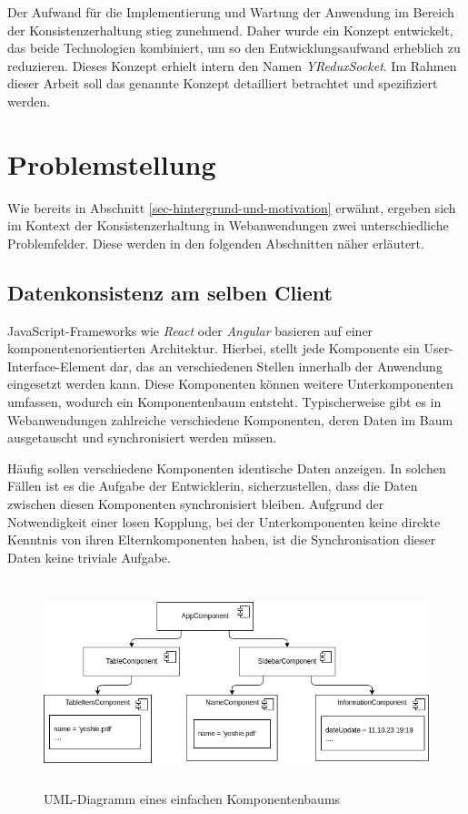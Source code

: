 \documentclass[12pt]{book}          %
\begin{document}
Der Aufwand für die Implementierung und Wartung der Anwendung im Bereich der Konsistenzerhaltung stieg zunehmend. Daher wurde ein Konzept entwickelt, das beide Technologien kombiniert, um so den Entwicklungsaufwand erheblich zu reduzieren. Dieses Konzept erhielt intern den Namen \textit{YReduxSocket}. Im Rahmen dieser Arbeit soll das genannte Konzept detailliert betrachtet und spezifiziert werden.

\section{Problemstellung}
\label{sec-problemstellung}

Wie bereits in Abschnitt \ref{sec-hintergrund-und-motivation} erwähnt, ergeben sich im Kontext der Konsistenzerhaltung in Webanwendungen zwei unterschiedliche Problemfelder. Diese werden in den folgenden Abschnitten näher erläutert.

\subsection{Datenkonsistenz am selben Client}
\label{subsec-datenkonsistenz-am-selben-client}

JavaScript-Frameworks wie \textit{React} oder \textit{Angular} basieren auf einer komponentenorientierten Architektur. Hierbei, stellt jede Komponente ein User-Interface-Element dar, das an verschiedenen Stellen innerhalb der Anwendung eingesetzt werden kann. Diese Komponenten können weitere Unterkomponenten umfassen, wodurch ein Komponentenbaum entsteht. Typischerweise gibt es in Webanwendungen zahlreiche verschiedene Komponenten,
deren Daten im Baum ausgetauscht und synchronisiert werden müssen.

Häufig sollen verschiedene Komponenten identische Daten anzeigen. In solchen Fällen ist es die Aufgabe der Entwicklerin, sicherzustellen, dass die Daten zwischen diesen Komponenten synchronisiert bleiben. Aufgrund der Notwendigkeit einer losen Kopplung, bei der Unterkomponenten keine direkte Kenntnis von ihren Elternkomponenten haben, ist die Synchronisation dieser Daten keine triviale Aufgabe.

\begin{figure}[htbp]
\centering
\includegraphics[height=6cm]{abbildungen/components-sync-1.png}
\caption{UML-Diagramm eines einfachen Komponentenbaums}
\label{simple-component-tree-uml}
\end{figure}
\end{document}
